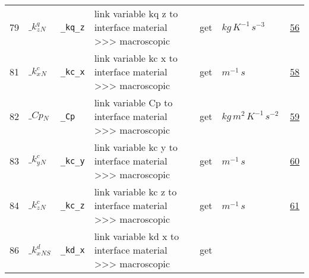\begin{longtable}{|p{1cm}|p{2.5cm}|p{4.5cm}|p{8cm}|p{3.0cm}|p{3cm}|p{1cm}|}
                 \\
            79
             & \hypertarget{"v:79"}{ $ {{\_k^q_z}}{_{N}} $}
             & \verb|_kq_z|
             & link variable kq z to interface material >>> macroscopic
             & \begin{lay}get \end{lay}
             & $ kg \,K^{-1} \,s^{-3} \, $
             &                 \hyperlink{"e:56"}{ 56 }
                 \\
            81
             & \hypertarget{"v:81"}{ $ {{\_k^c_x}}{_{N}} $}
             & \verb|_kc_x|
             & link variable kc x to interface material >>> macroscopic
             & \begin{lay}get \end{lay}
             & $ m^{-1} \,s \, $
             &                 \hyperlink{"e:58"}{ 58 }
                 \\
            82
             & \hypertarget{"v:82"}{ $ {{\_Cp}}{_{N}} $}
             & \verb|_Cp|
             & link variable Cp to interface material >>> macroscopic
             & \begin{lay}get \end{lay}
             & $ kg \,m^{2} \,K^{-1} \,s^{-2} \, $
             &                 \hyperlink{"e:59"}{ 59 }
                 \\
            83
             & \hypertarget{"v:83"}{ $ {{\_k^c_y}}{_{N}} $}
             & \verb|_kc_y|
             & link variable kc y to interface material >>> macroscopic
             & \begin{lay}get \end{lay}
             & $ m^{-1} \,s \, $
             &                 \hyperlink{"e:60"}{ 60 }
                 \\
            84
             & \hypertarget{"v:84"}{ $ {{\_k^c_z}}{_{N}} $}
             & \verb|_kc_z|
             & link variable kc z to interface material >>> macroscopic
             & \begin{lay}get \end{lay}
             & $ m^{-1} \,s \, $
             &                 \hyperlink{"e:61"}{ 61 }
                 \\
            86
             & \hypertarget{"v:86"}{ $ {{\_k^d_x}}{_{{N S}}} $}
             & \verb|_kd_x|
             & link variable kd x to interface material >>> macroscopic
             & \begin{lay}get \end{lay}

\end{longtable}
